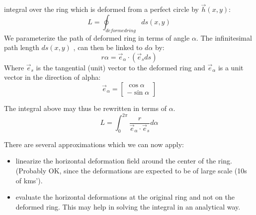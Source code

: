 \documentclass[a4paper,10pt,twoside,openany]{article}
\begin{document}
integral over the ring which is deformed from a perfect circle by $\vec{h}(x,y)$:
\begin{equation}
  L =\oint_{deformed ring} ds(x,y) 
\end{equation}
We parameterize the path of deformed ring in terms of angle
$\alpha$. The infinitesimal path length $ds(x,y)$ , can then be
linked to $d\alpha$ by:
\begin{equation}
r\alpha=\vec{e}_{\alpha}\cdot (\vec{e}_{s} ds)
\end{equation}
Where $\vec{e}_{s}$ is the tangential (unit) vector to the deformed ring and
$\vec{e}_{\alpha}$ is a unit vector in the direction of alpha:
\begin{equation}
\vec{e}_{\alpha}=\left[\begin{array}{c}\cos \alpha\\-\sin \alpha\end{array}\right]
\end{equation}

The integral above may thus be rewritten in terms of $\alpha$.
\begin{equation}
  L =\int_{0}^{2\pi} \frac{r}{\vec{e}_{\alpha}\cdot \vec{e}_{s}}d\alpha 
\end{equation}


There are several approximations which we can now apply:
\begin{itemize}
  \item linearize the horizontal deformation field around the center
    of the ring. (Probably OK, since the deformations are expected to
    be of large scale (10s of kms').
    \item evaluate  the horizontal deformations at the original ring
      and not on the deformed ring. This may help in solving the
      integral  in an analytical way.
  \end{itemize}

\end{document}
